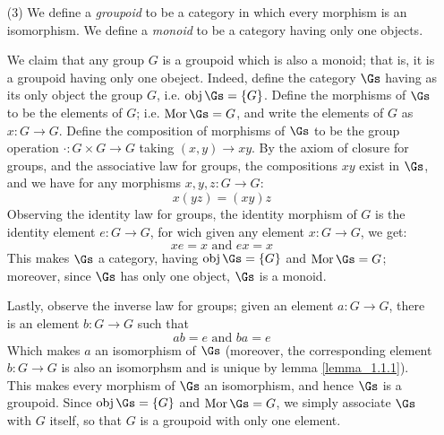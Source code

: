 \begin{example}
\begin{enumerate}
    \item[(3)] We define a \textit{groupoid} to be a category in
      which every morphism is an isomorphism. We define a
      \textit{monoid} to be a category having only one objects.

      We claim that any group $G$ is a groupoid which is also a
      monoid; that is, it is a groupoid having only one obeject.
      Indeed, define the category $\Gs$ having as its only object the group
      $G$, i.e. $\obj{\Gs}=\{G\}$. Define the morphisms of $\Gs$ to
      be the elements of $G$; i.e. $\Mor{\Gs}=G$, and write the
      elements of $G$ as $x:G \xrightarrow{} G$. Define the
      composition of morphisms of $\Gs$ to be the group operation
      $\cdot:G \times G \xrightarrow{} G$ taking $(x,y)
      \xrightarrow{} xy$. By the axiom of closure for groups, and the
      associative law for groups, the compositions $xy$ exist in
      $\Gs$, and we have for any morphisms $x,y,z:G \xrightarrow{}
      G$:
      \begin{equation*}
        x(yz)=(xy)z
      \end{equation*}
      Observing the identity law for groups, the identity morphism of $G$ is the
      identity element $e:G
      \xrightarrow{} G$, for wich given any element $x:G
      \xrightarrow{} G$, we get:
      \begin{equation*}
        xe=x \text{ and } ex=x
      \end{equation*}
      This makes $\Gs$ a category, having  $\obj{\Gs}=\{G\}$ and
      $\Mor{\Gs}=G$; moreover, since $\Gs$ has only one object, $\Gs$
      is a monoid.

      Lastly, observe the inverse law for groups; given an element
      $a:G \xrightarrow{} G$, there is an element $b:G \xrightarrow{}
      G$ such that
      \begin{equation*}
        ab=e \text{ and } ba=e
      \end{equation*}
      Which makes $a$ an isomorphism of $\Gs$ (moreover, the
      corresponding element $b:G \xrightarrow{} G$ is also an
      isomorphsm and is unique by lemma \ref{lemma_1.1.1}). This
      makes every morphism of $\Gs$ an isomorphism, and hence $\Gs$ is
      a groupoid. Since $\obj{\Gs}=\{G\}$ and $\Mor{\Gs}=G$, we
      simply associate $\Gs$ with $G$ itself, so that $G$ is a
      groupoid with only one element.
  \end{enumerate}
\end{example}
